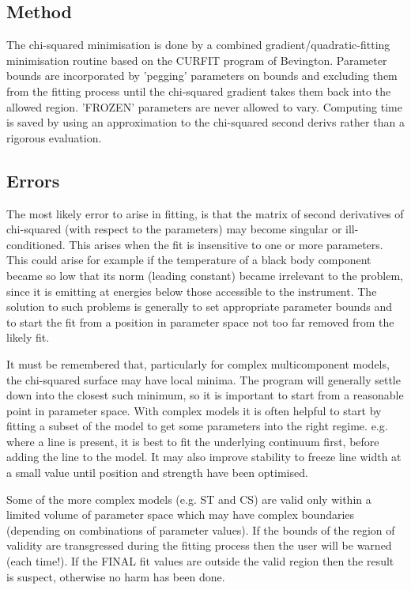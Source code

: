 \documentclass{book}
\renewcommand{\_}{{\tt\char'137}}     %
\begin{document}
\subsection{Method}
The chi-squared minimisation is done by a combined
gradient/quadratic-fitting minimisation routine based on the
CURFIT program of Bevington. Parameter bounds are incorporated by
'pegging' parameters on bounds and excluding them from the
fitting process until the chi-squared gradient takes them back
into the allowed region. 'FROZEN' parameters are never allowed to
vary. Computing time is saved by using an approximation to the
chi-squared second derivs rather than a rigorous evaluation.
 
\subsection{Errors}
The most likely error to arise in fitting, is that the matrix of
second derivatives of chi-squared (with respect to the
parameters) may become singular or ill-conditioned. This arises
when the fit is insensitive to one or more parameters. This could
arise for example if the temperature of a black body component
became so low that its norm (leading constant) became irrelevant
to the problem, since it is emitting at energies below those
accessible to the instrument. The solution to such problems is
generally to set appropriate parameter bounds and to start the
fit from a position in parameter space not too far removed from
the likely fit.
 
It must be remembered that, particularly for complex
multicomponent models, the chi-squared surface may have local
minima. The program will generally settle down into the closest
such minimum, so it is important to start from a reasonable point
in parameter space. With complex models it is often helpful to
start by fitting a subset of the model to get some parameters
into the right regime. e.g. where a line is present, it is best
to fit the underlying continuum first, before adding the line to
the model. It may also improve stability to freeze line width at
a small value until position and strength have been optimised.
 
Some of the more complex models (e.g. ST and CS) are valid only
within a limited volume of parameter space which may have complex
boundaries (depending on combinations of parameter values). If
the bounds of the region of validity are transgressed during the
fitting process then the user will be warned (each time!). If the
FINAL fit values are outside the valid region then the result is
suspect, otherwise no harm has been done.
 
\end{document}
